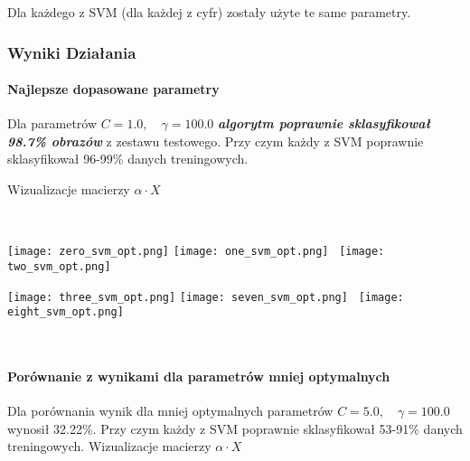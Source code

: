 \documentclass[11pt]{article}
\begin{document}
Dla każdego z SVM (dla każdej z cyfr) zostały użyte te same parametry.

\hypertarget{wyniki-dziaux142ania}{%
\subsubsection{Wyniki Działania}\label{wyniki-dziaux142ania}}

\hypertarget{najlepsze-dopasowane-parametry}{%
\paragraph{Najlepsze dopasowane
parametry}\label{najlepsze-dopasowane-parametry}}

Dla parametrów \(C = 1.0, \quad \gamma = 100.0\) \textbf{\emph{algorytm
poprawnie sklasyfikował 98.7\% obrazów}} z zestawu testowego. Przy czym
każdy z SVM poprawnie sklasyfikował 96-99\% danych treningowych.

Wizualizacje macierzy \(\alpha \cdot X\)

\\


\texttt{[image: zero\_svm\_opt.png]} \endminipage\hfill
{}
\texttt{[image: one\_svm\_opt.png]} \endminipage\hfill
{}\
\texttt{[image: two\_svm\_opt.png]} \endminipage


\texttt{[image: three\_svm\_opt.png]} \endminipage\hfill
{}
\texttt{[image: seven\_svm\_opt.png]} \endminipage\hfill
\minipage{0.32\textwidth}\
\texttt{[image: eight\_svm\_opt.png]} \endminipage

\\

\hypertarget{poruxf3wnanie-z-wynikami-dla-parametruxf3w-mniej-optymalnych}{%
\paragraph{Porównanie z wynikami dla parametrów mniej
optymalnych}\label{poruxf3wnanie-z-wynikami-dla-parametruxf3w-mniej-optymalnych}}

Dla porównania wynik dla mniej optymalnych parametrów
\(C = 5.0, \quad \gamma = 100.0\) wynosił 32.22\%. Przy czym każdy z SVM
poprawnie sklasyfikował 53-91\% danych treningowych.
\clearpage
Wizualizacje macierzy \(\alpha \cdot X\)
\end{document}

